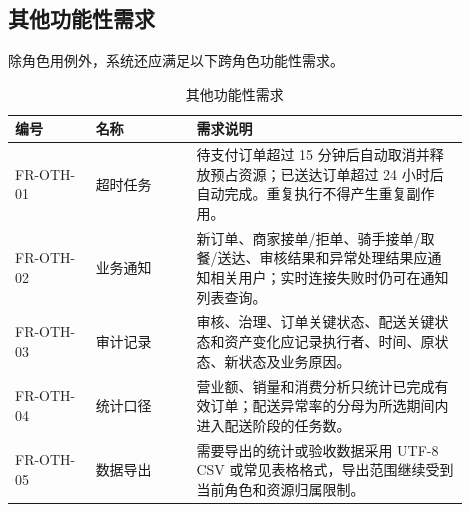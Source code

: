 \subsection{其他功能性需求}

除角色用例外，系统还应满足以下跨角色功能性需求。

\begin{longtable}{|L{0.16\linewidth}|L{0.20\linewidth}|L{0.54\linewidth}|}
\caption{其他功能性需求}\label{tab:other-functional}\\ \hline
\textbf{编号} & \textbf{名称} & \textbf{需求说明} \\ \hline
FR-OTH-01 & 超时任务 & 待支付订单超过 15 分钟后自动取消并释放预占资源；已送达订单超过 24 小时后自动完成。重复执行不得产生重复副作用。 \\ \hline
FR-OTH-02 & 业务通知 & 新订单、商家接单/拒单、骑手接单/取餐/送达、审核结果和异常处理结果应通知相关用户；实时连接失败时仍可在通知列表查询。 \\ \hline
FR-OTH-03 & 审计记录 & 审核、治理、订单关键状态、配送关键状态和资产变化应记录执行者、时间、原状态、新状态及业务原因。 \\ \hline
FR-OTH-04 & 统计口径 & 营业额、销量和消费分析只统计已完成有效订单；配送异常率的分母为所选期间内进入配送阶段的任务数。 \\ \hline
FR-OTH-05 & 数据导出 & 需要导出的统计或验收数据采用 UTF-8 CSV 或常见表格格式，导出范围继续受到当前角色和资源归属限制。 \\ \hline
\end{longtable}
